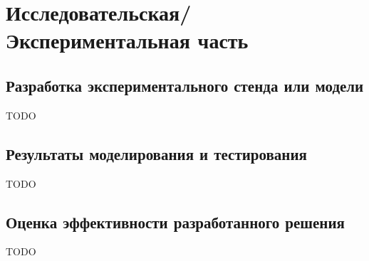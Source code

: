 \chapter{Исследовательская/Экспериментальная часть}

\section{Разработка экспериментального стенда или модели}
TODO
\section{Результаты моделирования и тестирования}
TODO
\section{Оценка эффективности разработанного решения}
TODO
